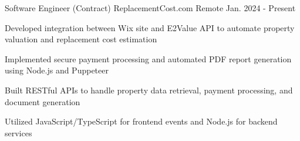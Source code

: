 \begin{cventries}
  \cventry
    {Software Engineer (Contract)}
    {ReplacementCost.com}
    {Remote}
    {Jan. 2024 - Present}
    {
      \begin{cvitems}
        \item {Developed integration between Wix site and E2Value API to automate property valuation and replacement cost estimation}
        \item {Implemented secure payment processing and automated PDF report generation using Node.js and Puppeteer}
        \item {Built RESTful APIs to handle property data retrieval, payment processing, and document generation}
        \item {Utilized JavaScript/TypeScript for frontend events and Node.js for backend services}
      \end{cvitems}
    }
\end{cventries}
